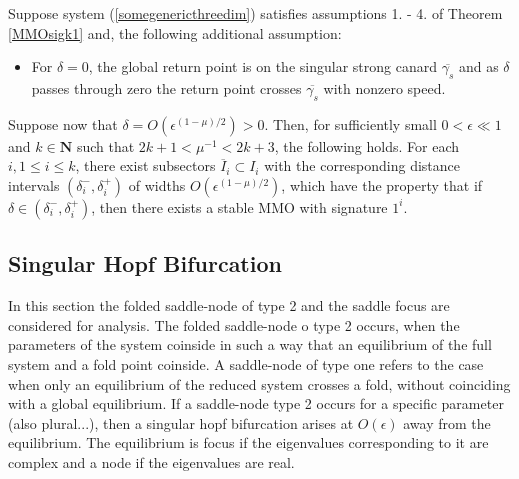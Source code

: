 \begin{theorem}
Suppose system (\ref{somegenericthreedim}) satisfies assumptions 1. - 4. of Theorem \ref{MMOsigk1} and, the following additional assumption:
\begin{itemize}
\item For $\delta = 0$, the global return point is on the singular strong canard $\overline{\gamma_s}$ and as $\delta$ passes through zero the return point crosses $\overline{\gamma_s}$ with nonzero speed.
\end{itemize}
Suppose now that $\delta= O(\epsilon ^{(1-\mu)/2})>0$. Then, for sufficiently small $0 < \epsilon \ll 1$ and $k \in \mathbf{N}$ such that $2k+1 < \mu^{-1} < 2k+ 3$, the following holds.
For each $i, 1 \leq i \leq k$, there exist subsectors $\overline{I}_i \subset I_i$ with the corresponding distance intervals $(\delta_i^-, \delta_i^+)$ of widths $O(\epsilon^{(1-\mu)/2})$, which have the property that if $\delta \in (\delta_i^-, \delta_i^+)$, then there exists a stable MMO with signature $1^i$.
\end{theorem}





















































\subsection{Singular Hopf Bifurcation}
In this section the folded saddle-node of type 2 and the saddle focus are considered for analysis.
The folded saddle-node o type 2 occurs, when the parameters of the system coinside in such a way that an equilibrium of the full system and a fold point coinside. A saddle-node of type one refers to the case when only an equilibrium of the reduced system crosses a fold, without coinciding with a global equilibrium.
If a saddle-node type 2 occurs for a specific parameter (also plural...), then a singular hopf bifurcation arises at $O(\epsilon)$ away from the equilibrium.
The equilibrium is focus if the eigenvalues corresponding to it are complex and a node if the eigenvalues are real.

